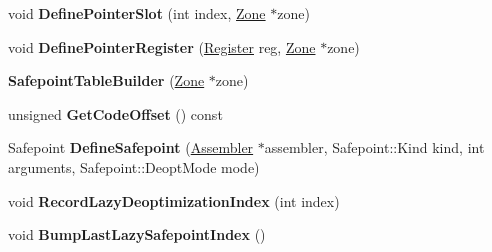 \begin{DoxyCompactItemize}
\item 
void {\bfseries Define\+Pointer\+Slot} (int index, \hyperlink{classv8_1_1internal_1_1_zone}{Zone} $\ast$zone)\hypertarget{classv8_1_1internal_1_1_b_a_s_e___e_m_b_e_d_d_e_d_a824fd5dd63a6711743e337886c214fb7}{}\label{classv8_1_1internal_1_1_b_a_s_e___e_m_b_e_d_d_e_d_a824fd5dd63a6711743e337886c214fb7}

\item 
void {\bfseries Define\+Pointer\+Register} (\hyperlink{structv8_1_1internal_1_1_register}{Register} reg, \hyperlink{classv8_1_1internal_1_1_zone}{Zone} $\ast$zone)\hypertarget{classv8_1_1internal_1_1_b_a_s_e___e_m_b_e_d_d_e_d_a76c92b028101fa730e61402d562c1c1a}{}\label{classv8_1_1internal_1_1_b_a_s_e___e_m_b_e_d_d_e_d_a76c92b028101fa730e61402d562c1c1a}

\item 
{\bfseries Safepoint\+Table\+Builder} (\hyperlink{classv8_1_1internal_1_1_zone}{Zone} $\ast$zone)\hypertarget{classv8_1_1internal_1_1_b_a_s_e___e_m_b_e_d_d_e_d_a60b4298e5a8e6b35ea1c34a9c7e722b1}{}\label{classv8_1_1internal_1_1_b_a_s_e___e_m_b_e_d_d_e_d_a60b4298e5a8e6b35ea1c34a9c7e722b1}

\item 
unsigned {\bfseries Get\+Code\+Offset} () const \hypertarget{classv8_1_1internal_1_1_b_a_s_e___e_m_b_e_d_d_e_d_ad29a126008e6891a795b8b3b39119c97}{}\label{classv8_1_1internal_1_1_b_a_s_e___e_m_b_e_d_d_e_d_ad29a126008e6891a795b8b3b39119c97}

\item 
Safepoint {\bfseries Define\+Safepoint} (\hyperlink{classv8_1_1internal_1_1_assembler}{Assembler} $\ast$assembler, Safepoint\+::\+Kind kind, int arguments, Safepoint\+::\+Deopt\+Mode mode)\hypertarget{classv8_1_1internal_1_1_b_a_s_e___e_m_b_e_d_d_e_d_af9578a250e3e253b38c5ed8b3514473e}{}\label{classv8_1_1internal_1_1_b_a_s_e___e_m_b_e_d_d_e_d_af9578a250e3e253b38c5ed8b3514473e}

\item 
void {\bfseries Record\+Lazy\+Deoptimization\+Index} (int index)\hypertarget{classv8_1_1internal_1_1_b_a_s_e___e_m_b_e_d_d_e_d_a21d046a1795c62f6254cf6f98e5482ec}{}\label{classv8_1_1internal_1_1_b_a_s_e___e_m_b_e_d_d_e_d_a21d046a1795c62f6254cf6f98e5482ec}

\item 
void {\bfseries Bump\+Last\+Lazy\+Safepoint\+Index} ()\hypertarget{classv8_1_1internal_1_1_b_a_s_e___e_m_b_e_d_d_e_d_a18c0990e83100e47ffcb0a541e6d55ee}{}\label{classv8_1_1internal_1_1_b_a_s_e___e_m_b_e_d_d_e_d_a18c0990e83100e47ffcb0a541e6d55ee}


\end{DoxyCompactItemize}
